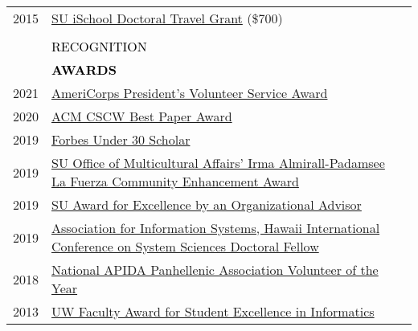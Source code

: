 \documentclass[11pt]{article}
\begin{document}
{{\begin{longtable}{Rp{0.75in}p{5.0in}}
\footnotesize{2015} & \href{https://ischool.syr.edu/research/grants-and-awards/}{SU iSchool Doctoral Travel Grant} (\$700)\\

\\

\sout{\hfill} 
& \par \Large \textcolor{black}{\uppercase{Recognition\hspace{6pt} \sout{\hfill}}}\\

& \textcolor{black}{\uppercase{\textbf{Awards}}}\\

\footnotesize{2021} & 
\href{https://www.presidentialserviceawards.gov/}{AmeriCorps President's Volunteer Service Award}\\

\footnotesize{2020} & 
\href{https://cscw.acm.org/2020/awards/}{ACM CSCW Best Paper Award}\\

\footnotesize{2019} & 
\href{https://www.forbes.com/sites/forbespr/2017/09/12/forbes-under-30-scholars-program-focused-on-diversity-and-inclusion-offers-1000-college-students-access-to-2017-forbes-under-30-summit/}{Forbes Under 30 Scholar}\\

\footnotesize{2019} & 
\href{https://news.syr.edu/blog/2019/04/29/44-stars-of-excellence-awards-honor-members-of-campus-community/}{SU Office of Multicultural Affairs' Irma Almirall-Padamsee La Fuerza Community Enhancement Award}\\

\footnotesize{2019} &\href{https://news.syr.edu/blog/2019/04/29/44-stars-of-excellence-awards-honor-members-of-campus-community/}{SU Award for Excellence by an Organizational Advisor}\\

\footnotesize{2019} &
\href{https://www.twitter.com/bdosono/status/1082439167512961024}{Association for Information Systems, Hawaii International Conference on System Sciences Doctoral Fellow}\\

\footnotesize{2018} &
\href{http://www.napahq.org/2018-napa-standards-of-excellence-award-recipients/}{National APIDA Panhellenic Association Volunteer of the Year}\\

\footnotesize{2013} & \href{https://ischool.uw.edu/news/2016/12/2013-ischool-convocation-celebrates-achievement-and-community}{UW Faculty Award for Student Excellence in Informatics}\\


\end{longtable}}}
\end{document}
